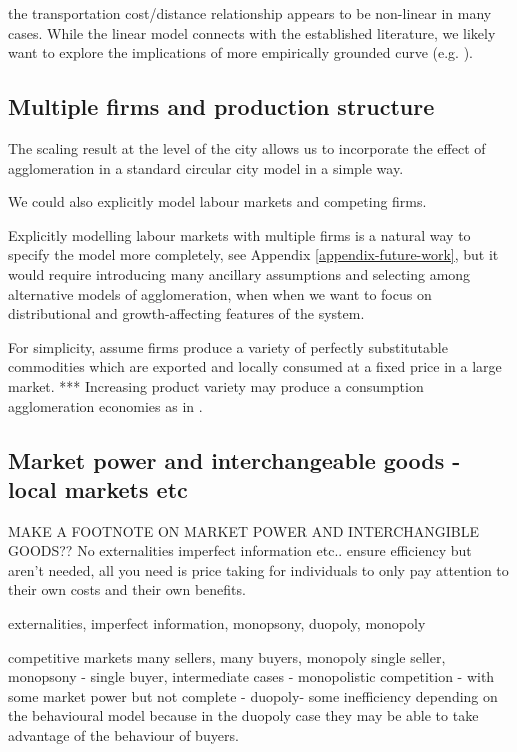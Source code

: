 the transportation cost/distance relationship appears to be non-linear in many cases. While the linear model connects with the established literature, we likely want to explore the implications of more empirically grounded curve (e.g. \cite{bertaudSpatialDistributionPopulation2003}).

\subsection{Multiple firms and production structure}
The scaling result at the level of the city allows us to incorporate the effect of agglomeration in a standard \gls{circular city} model in a simple way. 

We could also explicitly model labour markets and competing firms. 

Explicitly modelling labour markets with multiple firms is a natural way to specify the model more completely, see Appendix \ref{appendix-future-work},  but it would require introducing many ancillary assumptions and selecting among alternative models of agglomeration, when when we want to focus on distributional and growth-affecting features of the system.

For simplicity, assume firms produce a variety of perfectly substitutable commodities which are exported and locally consumed at a fixed price in a large market. 
***  Increasing product variety may produce a consumption agglomeration economies as in \cite{fujitaSpatialEconomyCities1999}.

\subsection{Market power and interchangeable goods - local markets etc}
MAKE A FOOTNOTE ON MARKET POWER AND INTERCHANGIBLE GOODS??
No externalities imperfect information etc.. ensure efficiency but aren't needed, all you need is price taking for individuals to only pay attention to their own costs and their own benefits. 

\gls{externalities}, \gls{imperfect information}, \gls{monopsony}, \gls{duopoly}, \gls{monopoly}

competitive markets many sellers, many buyers, monopoly single seller, monopsony - single buyer, intermediate cases - monopolistic competition - with some market power but not complete - duopoly- some inefficiency depending on the behavioural model because in the duopoly case they may be able to take advantage of the behaviour of buyers.

